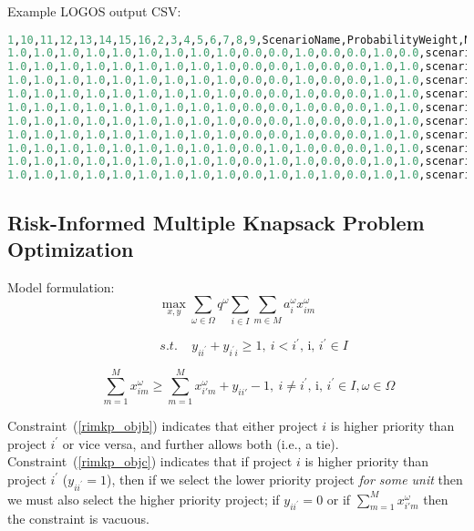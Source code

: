Example LOGOS output CSV:
\begin{lstlisting}[basicstyle=\tiny,language=python]
1,10,11,12,13,14,15,16,2,3,4,5,6,7,8,9,ScenarioName,ProbabilityWeight,MaxNPV
1.0,1.0,1.0,1.0,1.0,1.0,1.0,1.0,1.0,0.0,0.0,1.0,0.0,0.0,1.0,0.0,scenario_1,0.012,-23.581
1.0,1.0,1.0,1.0,1.0,1.0,1.0,1.0,1.0,0.0,0.0,1.0,0.0,0.0,1.0,1.0,scenario_2,0.019,-23.459
1.0,1.0,1.0,1.0,1.0,1.0,1.0,1.0,1.0,0.0,0.0,1.0,0.0,0.0,1.0,1.0,scenario_3,0.032,-23.459
1.0,1.0,1.0,1.0,1.0,1.0,1.0,1.0,1.0,0.0,0.0,1.0,0.0,0.0,1.0,1.0,scenario_4,0.052,-23.459
1.0,1.0,1.0,1.0,1.0,1.0,1.0,1.0,1.0,0.0,0.0,1.0,0.0,0.0,1.0,1.0,scenario_5,0.086,-23.459
1.0,1.0,1.0,1.0,1.0,1.0,1.0,1.0,1.0,0.0,0.0,1.0,0.0,0.0,1.0,1.0,scenario_6,0.142,-23.459
1.0,1.0,1.0,1.0,1.0,1.0,1.0,1.0,1.0,0.0,0.0,1.0,0.0,0.0,1.0,1.0,scenario_7,0.235,-23.459
1.0,1.0,1.0,1.0,1.0,1.0,1.0,1.0,1.0,0.0,1.0,1.0,0.0,0.0,1.0,1.0,scenario_8,0.188,37.130
1.0,1.0,1.0,1.0,1.0,1.0,1.0,1.0,1.0,0.0,1.0,1.0,0.0,0.0,1.0,1.0,scenario_9,0.141,37.1230
1.0,1.0,1.0,1.0,1.0,1.0,1.0,1.0,1.0,0.0,1.0,1.0,1.0,0.0,1.0,1.0,scenario_10,0.093,42.303
\end{lstlisting}

\subsection{Risk-Informed Multiple Knapsack Problem Optimization}
\label{subsec:RImkp}

Model formulation:\\

\begin{equation}\label{rimkp_obja}
\mathop{\max}_{x,y} \sum _{ \omega  \in  \Omega }q^{ \omega } \sum _{i \in I} \sum _{m \in M}a_{i}^{ \omega }x_{im}^{ \omega }
\end{equation}

\begin{equation}\label{rimkp_objb}
~~~~~~~~~~~~s.t.~~~~~y_{ii^{'}}+y_{i^{'}i} \geq 1,~ i<i^{'}\text{, i, }i^{'} \in I
\end{equation}

\begin{equation}\label{rimkp_objc}
~~~~~~~~\sum_{m=1}^{M} x_{im}^\omega \geq \sum_{m=1}^{M} x_{i'm}^\omega + y_{ii'} -1,~ i \neq i^{'}\text{, i, }i^{'} \in I,  \omega  \in  \Omega
\end{equation}

Constraint~(\ref{rimkp_objb}) indicates that either project $i$  is higher priority
than project  $i^{'}$  or vice versa, and further allows both (i.e., a tie).
Constraint~(\ref{rimkp_objc}) indicates that if project  $i$  is higher priority than
project  $i^{'}$ ($y_{ii^{'}}=1$), then if we select the lower priority project
\textit{for some unit} then we must also select the higher priority project;
if  $y_{ii^{'}}=0$  or if  $\sum_{m=1}^{M} x_{i'm}^\omega$  then the constraint is vacuous.\par

